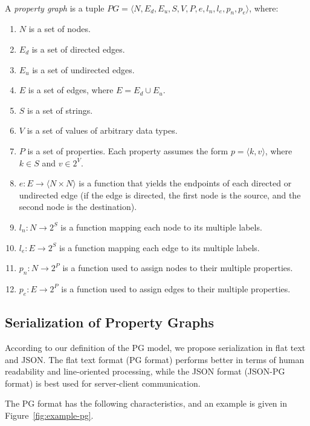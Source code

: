 \documentclass[runningheads]{llncs}
\begin{document}
\begin{defi}
\leavevmode \vspace{1mm} \\
A \emph{property graph} is a tuple
$PG = \langle N, E_d, E_u, S, V, P, e, l_n, l_e, p_n, p_e\rangle$, where:
\begin{enumerate}
    \item $N$ is a set of nodes.
    \item $E_d$ is a set of directed edges.
    \item $E_u$ is a set of undirected edges.
    \item $E$ is a set of edges, where $E = E_d \cup E_u$.
    \item $S$ is a set of strings.
    \item $V$ is a set of values of arbitrary data types.
    \item $P$ is a set of properties. Each property assumes the form $p = \langle k,v \rangle$, where $k \in S$ and $v \in 2^V$.
    \item $e: E \to \langle N \times N \rangle$ is a function that yields the endpoints of each directed or undirected edge (if the edge is directed, the first node is the source, and the second node is the destination).
    \item $l_n : N \to 2^S$ is a function mapping each node to its multiple labels.
    \item $l_e : E \to 2^S$ is a function mapping each edge to its multiple labels.
    \item $p_n : N \to 2^P$ is a function used to assign nodes to their multiple properties.
    \item $p_e : E \to 2^P$ is a function used to assign edges to their multiple properties.
\end{enumerate}
\end{defi}


\subsection{Serialization of Property Graphs}
According to our definition of the PG model, we propose serialization in flat text and JSON. The flat text format (PG format) performs better in terms of human readability and line-oriented processing, while the JSON format (JSON-PG format) is best used for server-client communication.

The PG format has the following characteristics, and an example is given in Figure~\ref{fig:example-pg}.
\end{document}
